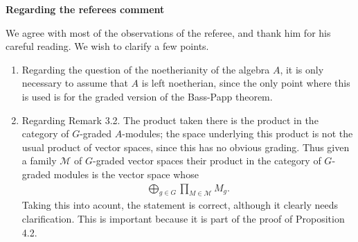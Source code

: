 \documentclass{article}
\begin{document}
\textbf{Regarding the referees comment}
\bigskip

We agree with most of the observations of the referee, and thank him for his 
careful reading. We wish to clarify a few points.

\begin{enumerate}
\item Regarding the question of the noetherianity of the algebra $A$, it is 
only necessary to assume that $A$ is left noetherian, since the only point 
where this is used is for the graded version of the Bass-Papp theorem.

\item Regarding Remark 3.2. The product taken there is the product in the 
category of $G$-graded $A$-modules; the space underlying this product is not 
the usual product of vector spaces, since this has no obvious grading. Thus 
given a family $\mathcal M$ of $G$-graded vector spaces their product in the 
category of $G$-graded modules is the vector space whose 
\begin{align*}
\bigoplus_{g \in G} \prod_{M \in \mathcal M} M_g.
\end{align*}
Taking this into acount, the statement is correct, although it clearly needs 
clarification. This is important because it is part of the proof of 
Proposition 4.2.
\end{enumerate}
\end{document}
